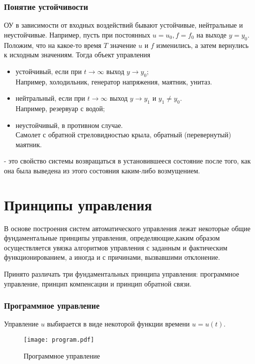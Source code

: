 \documentclass[../../TAU.tex]{subfiles}
\begin{document}
\subsubsection{Понятие устойчивости}
    ОУ в зависимости от входных воздействий бывают устойчивые, нейтральные и неустойчивые. Например, пусть при постоянных $u = u_0, f = f_0$ на выходе $y = y_0$. Положим, что на какое-то время $T$ значение $u$ и $f$ изменились, а затем вернулись к исходным значениям. Тогда объект управления

    \begin{itemize}
        \item устойчивый, если при $t \rightarrow \infty$ выход $y \rightarrow y_0$; \\
    Например, холодильник, генератор напряжения, маятник, унитаз.
        \item нейтральный, если при $t \rightarrow \infty$ выход $y \rightarrow y_1$ и $y_1\neq y_0$. \\
    Например, резервуар с водой;
        \item неустойчивый, в противном случае.\\
    Самолет с обратной стреловидностью крыла, обратный (перевернутый) маятник.
    \end{itemize}

     - это свойство системы возвращаться в установившееся состояние после того, как она была выведена из этого состояния каким-либо возмущением. 
\section{Принципы управления}
    В основе построения систем автоматического управления лежат некоторые общие фундаментальные принципы управления, определяющие,каким образом осуществляется увязка алгоритмов управления с заданным и фактическим функционированием, а иногда и с причинами, вызвавшими отклонение.\par
    Принято различать три фундаментальных принципа управления: программное управление, принцип компенсации и принцип обратной связи.

\subsubsection{Программное управление}

    Управление $u$ выбирается в виде некоторой функции времени $u = u(t)$.

    \begin{figure}[h]
    \centering
    \texttt{[image: program.pdf]}
    \caption{Программное управление}
    \centering
    \end{figure}
\end{document}
